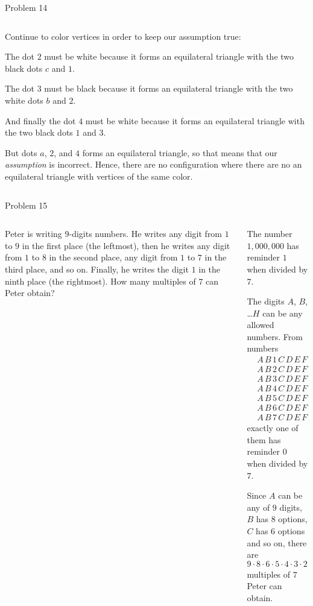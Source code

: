 \documentclass[9pt,aspectratio=169]{beamer}
\begin{document}
\begin{frame}{Problem 14}
\begin{columns}[T]
\begin{column}{0.5\textwidth}
      Continue to color vertices in order to keep our assumption true:
      
      The dot $2$ must be white because it forms an equilateral triangle with the two black dots $c$ and $1$.

      The dot $3$ must be black because it forms an equilateral triangle with the two white dots $b$ and $2$. 
      
      And finally the dot $4$ must be white because it forms an equilateral triangle with the two black dots $1$ and $3$. 

      But dots $a$, $2$, and $4$ forms an equilateral triangle, so that means that our \emph{assumption} is incorrect. Hence, there are no configuration where there are no an equilateral triangle with vertices of the same color.
    \end{column}
  \end{columns}
\end{frame}

\begin{frame}{Problem 15}
  \begin{columns}[T]
    \begin{column}{0.5\textwidth}
      \begin{problem}
        Peter is writing $9$-digits numbers. He writes any digit from $1$ to $9$ in the first place (the leftmost), then he writes any digit from $1$ to $8$ in the second place, any digit from $1$ to $7$ in the third place, and so on. Finally, he writes the digit $1$ in the ninth place (the rightmost). How many multiples of $7$ can Peter obtain?
      \end{problem}
    \end{column}
    \begin{column}{0.5\textwidth}
      The number $1{,}000{,}000$ has reminder $1$ when divided by $7$. 

      The digits $A$, $B$, \dots $H$ can be any allowed numbers. From numbers
      \begin{align*}
        &A\, B \, 1 \, C\, D\, E\, F\, G\, H\, \\
        &A\, B \, 2 \, C\, D\, E\, F\, G\, H\, \\
        &A\, B \, 3 \, C\, D\, E\, F\, G\, H\, \\
        &A\, B \, 4 \, C\, D\, E\, F\, G\, H\, \\
        &A\, B \, 5 \, C\, D\, E\, F\, G\, H\, \\
        &A\, B \, 6 \, C\, D\, E\, F\, G\, H\, \\
        &A\, B \, 7 \, C\, D\, E\, F\, G\, H\,
      \end{align*} 
      exactly one of them has reminder $0$ when divided by $7$.

      Since $A$ can be any of $9$ digits, $B$ has $8$ options, $C$ has $6$ options and so on, there are 
      \[ 9 \cdot 8 \cdot 6 \cdot 5 \cdot 4 \cdot 3 \cdot 2 \cdot 1 = 51{,}840 \] multiples of $7$ Peter can obtain.
    \end{column}
  \end{columns}
\end{frame}
\end{document}
